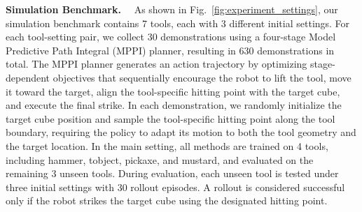 \textbf{Simulation Benchmark.}~~
As shown in Fig.~\ref{fig:experiment_settings}, our simulation benchmark contains 7 tools, each with 3 different initial settings. 
For each tool-setting pair, we collect 30 demonstrations using a four-stage Model Predictive Path Integral (MPPI) planner, resulting in 630 demonstrations in total. The MPPI planner generates an action trajectory by optimizing stage-dependent objectives that sequentially encourage the robot to lift the tool, move it toward the target, align the tool-specific hitting point with the target cube, and execute the final strike. In each demonstration, we randomly initialize the target cube position and sample the tool-specific hitting point along the tool boundary, requiring the policy to adapt its motion to both the tool geometry and the target location. In the main setting, all methods are trained on 4 tools, including hammer, tobject, pickaxe, and mustard, and evaluated on the remaining 3 unseen tools. During evaluation, each unseen tool is tested under three initial settings with 30 rollout episodes. A rollout is considered successful only if the robot strikes the target cube using the designated hitting point.



